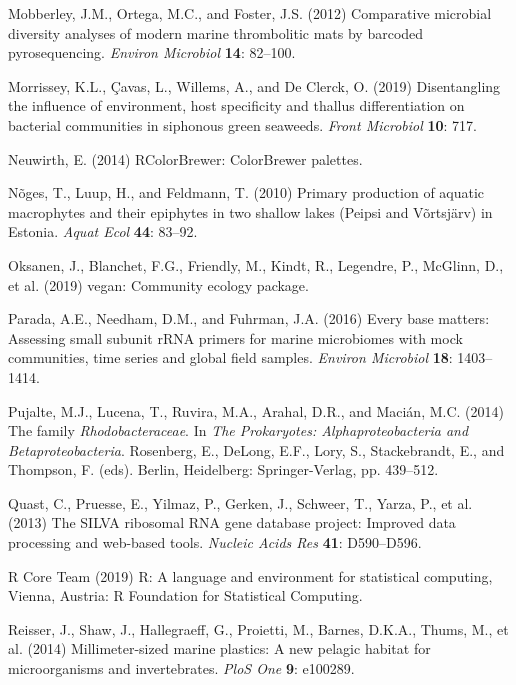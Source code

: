 \documentclass[12pt,]{article}
\begin{document}
\leavevmode\hypertarget{ref-Mobberley2012}{}%
Mobberley, J.M., Ortega, M.C., and Foster, J.S. (2012) Comparative
microbial diversity analyses of modern marine thrombolitic mats by
barcoded pyrosequencing. \emph{Environ Microbiol} \textbf{14}: 82--100.

\leavevmode\hypertarget{ref-Morrissey2019}{}%
Morrissey, K.L., Çavas, L., Willems, A., and De Clerck, O. (2019)
Disentangling the influence of environment, host specificity and thallus
differentiation on bacterial communities in siphonous green seaweeds.
\emph{Front Microbiol} \textbf{10}: 717.

\leavevmode\hypertarget{ref-Neuwirth2014}{}%
Neuwirth, E. (2014) RColorBrewer: ColorBrewer palettes.

\leavevmode\hypertarget{ref-Noges2010}{}%
Nõges, T., Luup, H., and Feldmann, T. (2010) Primary production of
aquatic macrophytes and their epiphytes in two shallow lakes (Peipsi and
Võrtsjärv) in Estonia. \emph{Aquat Ecol} \textbf{44}: 83--92.

\leavevmode\hypertarget{ref-Oksanen2019}{}%
Oksanen, J., Blanchet, F.G., Friendly, M., Kindt, R., Legendre, P.,
McGlinn, D., et al. (2019) vegan: Community ecology package.

\leavevmode\hypertarget{ref-Parada2016}{}%
Parada, A.E., Needham, D.M., and Fuhrman, J.A. (2016) Every base
matters: Assessing small subunit rRNA primers for marine microbiomes
with mock communities, time series and global field samples.
\emph{Environ Microbiol} \textbf{18}: 1403--1414.

\leavevmode\hypertarget{ref-Pujalte2014}{}%
Pujalte, M.J., Lucena, T., Ruvira, M.A., Arahal, D.R., and Macián, M.C.
(2014) The family \emph{Rhodobacteraceae}. In \emph{The Prokaryotes:
Alphaproteobacteria and Betaproteobacteria}. Rosenberg, E., DeLong,
E.F., Lory, S., Stackebrandt, E., and Thompson, F. (eds). Berlin,
Heidelberg: Springer-Verlag, pp. 439--512.

\leavevmode\hypertarget{ref-Quast2013}{}%
Quast, C., Pruesse, E., Yilmaz, P., Gerken, J., Schweer, T., Yarza, P.,
et al. (2013) The SILVA ribosomal RNA gene database project: Improved
data processing and web-based tools. \emph{Nucleic Acids Res}
\textbf{41}: D590--D596.

\leavevmode\hypertarget{ref-RCoreTeam2019}{}%
R Core Team (2019) R: A language and environment for statistical
computing, Vienna, Austria: R Foundation for Statistical Computing.

\leavevmode\hypertarget{ref-Reisser2014}{}%
Reisser, J., Shaw, J., Hallegraeff, G., Proietti, M., Barnes, D.K.A.,
Thums, M., et al. (2014) Millimeter-sized marine plastics: A new pelagic
habitat for microorganisms and invertebrates. \emph{PloS One}
\textbf{9}: e100289.
\end{document}
